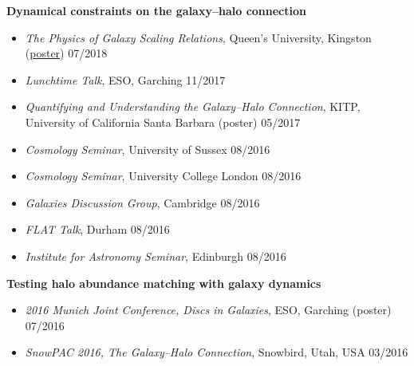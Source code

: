 \documentclass[11pt]{article}
\newenvironment{outerlist}[1][\enskip\textbullet]%
        {\begin{itemize}[#1]}{\end{itemize}%
         \vspace{-.6\baselineskip}}
\newcommand{\blankline}{\quad\pagebreak[2]}
\begin{document}
\blankline

\textbf{Dynamical constraints on the galaxy--halo connection} 
\vspace{-0.35\baselineskip}
\begin{outerlist}
\item[] \textit{The Physics of Galaxy Scaling Relations}, Queen's University, Kingston (\href{https://darkmatter2018.weebly.com/posters.html}{poster}) \hfill 07/2018 \\
\vspace{-1.4\baselineskip}
\item[] \textit{Lunchtime Talk}, ESO, Garching \hfill 11/2017 \\
\vspace{-1.4\baselineskip}
\item[] \textit{Quantifying and Understanding the Galaxy--Halo Connection}, KITP, University of California Santa Barbara (poster) \hfill 05/2017 \\
\vspace{-1.4\baselineskip}
\item[] \textit{Cosmology Seminar}, University of Sussex \hfill 08/2016 \\
\vspace{-1.4\baselineskip}
\item[] \textit{Cosmology Seminar}, University College London \hfill 08/2016 \\
\vspace{-1.4\baselineskip}
\item[] \textit{Galaxies Discussion Group}, Cambridge \hfill 08/2016 \\
\vspace{-1.4\baselineskip}
\item[] \textit{FLAT Talk}, Durham \hfill 08/2016 \\
\vspace{-1.4\baselineskip}
\item[] \textit{Institute for Astronomy Seminar}, Edinburgh \hfill 08/2016
\end{outerlist}

\blankline

\textbf{Testing halo abundance matching with galaxy dynamics}
\vspace{-0.35\baselineskip}
\begin{outerlist}
\item[] \textit{2016 Munich Joint Conference, Discs in Galaxies}, ESO, Garching (poster) \hfill 07/2016 \\
\vspace{-1.4\baselineskip}
\item[] \textit{SnowPAC 2016, The Galaxy--Halo Connection}, Snowbird, Utah, USA \hfill 03/2016
\end{outerlist}
\end{document}
